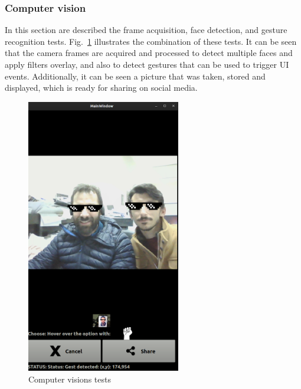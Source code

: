 \subsubsection{Computer vision}
\label{sec:computer-vision-1}
In this section are described the frame acquisition,
face detection, and gesture recognition tests. Fig.~\ref{fig:cv-tests}
illustrates the combination of these tests. It can be seen that the camera
frames are acquired and processed to detect multiple faces and apply filters overlay, and
also to detect gestures that can be used to trigger UI events.
Additionally, it can be seen a picture that was taken, stored and displayed,
which is ready for sharing on social media.
\begin{figure}[htb!]
\centering
    \includegraphics[width=0.6\textwidth]{./img/UI-test-filters.png}
  \caption{Computer visions tests}%
\label{fig:cv-tests}
\end{figure}

